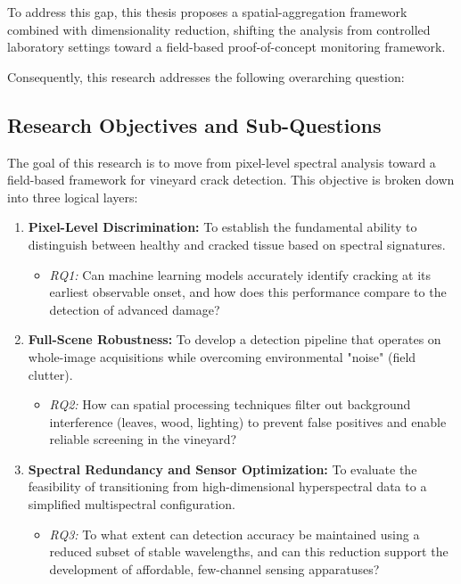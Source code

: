 \medskip
\noindent
To address this gap, this thesis proposes a spatial-aggregation framework combined with dimensionality reduction, shifting the analysis from controlled laboratory settings toward a field-based proof-of-concept monitoring framework.

\medskip
\noindent
Consequently, this research addresses the following overarching question:


\subsection{Research Objectives and Sub-Questions}

The goal of this research is to move from pixel-level spectral analysis toward a field-based framework for vineyard crack detection. This objective is broken down into three logical layers:

\begin{enumerate}[leftmargin=*]
    \item \textbf{Pixel-Level Discrimination:} To establish the fundamental ability to distinguish between healthy and cracked tissue based on spectral signatures.
    \begin{itemize}[label=--, leftmargin=*]
        \item \textit{RQ1:} Can machine learning models accurately identify cracking at its earliest observable onset, and how does this performance compare to the detection of advanced damage?
    \end{itemize}

    \item \textbf{Full-Scene Robustness:} To develop a detection pipeline that operates on whole-image acquisitions while overcoming environmental "noise" (field clutter).
    \begin{itemize}[label=--, leftmargin=*]
        \item \textit{RQ2:} How can spatial processing techniques filter out background interference (leaves, wood, lighting) to prevent false positives and enable reliable screening in the vineyard?
    \end{itemize}

    \item \textbf{Spectral Redundancy and Sensor Optimization:} To evaluate the feasibility of transitioning from high-dimensional hyperspectral data to a simplified multispectral configuration.
    \begin{itemize}[label=--, leftmargin=*]
        \item \textit{RQ3:} To what extent can detection accuracy be maintained using a reduced subset of stable wavelengths, and can this reduction support the development of affordable, few-channel sensing apparatuses?
    \end{itemize}
\end{enumerate}

